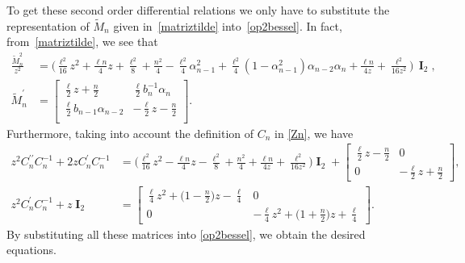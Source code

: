 \documentclass[12pt]{amsart}
\begin{document}
To get these second order differential relations we only have to substitute the representation of \(\widetilde M_n \) given in~\eqref{matriztilde} into~\eqref{op2bessel}.
In fact,
from~\eqref{matriztilde},
we see that
\begin{align*}
\frac{
\widetilde M_n^2 
}{z^2 } 
 & =
 \Big(\frac{\ell^2}{16}z^2+\frac{\ell n}{4}z+\frac{\ell^2}{8}+\frac{n^2}{4}-\frac{\ell^2}{4}\alpha_{n-1}^2+\frac{\ell^2}{4}(1-\alpha_{n-1}^2)\alpha_{n-2}\alpha_n+\frac{\ell n}{4z}+\frac{\ell^2}{16z^2}\Big)
 \, \mathbf{\operatorname I}_2,\\
\widetilde M_n^\prime & =
\begin{bmatrix}
 \frac{\ell}{2}z+\frac{n}{2} & \frac{\ell}{2}b_n^{-1}\alpha_n \\
 \frac{\ell}{2}b_{n-1}\alpha_{n-2} & -\frac{\ell}{2}z-\frac{n}{2} \\
\end{bmatrix}.
\end{align*}
Furthermore, taking into account the definition of \( C_n \) in \eqref{Zn},
we have
\begin{align*}
z^2C_n^{\prime\prime}C_n^{-1}+2zC_n^{\prime}C_n^{-1}
& 
= \big( \frac{\ell^2}{16}z^2-\frac{\ell n}{4} z-\frac{\ell^2}{8}+\frac{n^2}{4}+\frac{\ell n}{4z}+\frac{\ell^2}{16z^2} \big) \mathbf{\operatorname I}_2 +
 \begin{bmatrix}
\frac{\ell}{2} z-\frac{n}{2} & 0\\
0 & - \frac{\ell}{2} z + \frac{n}{2}
\end{bmatrix} , \\
z^2C_n^{\prime}C_n^{-1}+z\mathbf{\operatorname I}_2
 &=
\begin{bmatrix}
\frac{\ell}{4}z^2+\big(1-\frac{n}{2}\big)z-\frac{\ell}{4} & 0\\
0 & -\frac{\ell}{4}z^2+\big(1+\frac{n}{2}\big)z+\frac{\ell}{4}
\end{bmatrix} .
\end{align*}
By substituting all these matrices into \eqref{op2bessel}, we obtain the desired equations.
\end{document}
